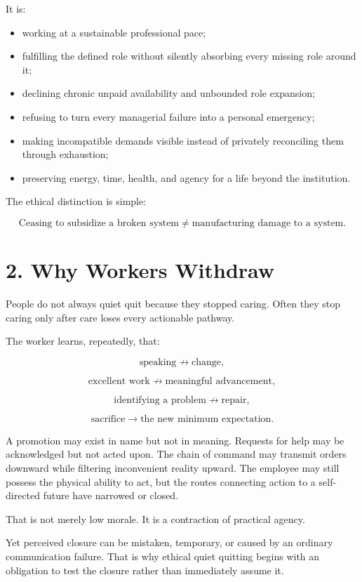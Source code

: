 \documentclass[11pt,oneside]{article}
\providecommand{\tightlist}{%
  \setlength{\itemsep}{0.22em}\setlength{\parskip}{0pt}}
\begin{document}
It is:

\begin{itemize}
\tightlist
\item
  working at a sustainable professional pace;
\item
  fulfilling the defined role without silently absorbing every missing role around it;
\item
  declining chronic unpaid availability and unbounded role expansion;
\item
  refusing to turn every managerial failure into a personal emergency;
\item
  making incompatible demands visible instead of privately reconciling them through exhaustion;
\item
  preserving energy, time, health, and agency for a life beyond the institution.
\end{itemize}

The ethical distinction is simple:

\[
\boxed{\text{Ceasing to subsidize a broken system} \neq \text{manufacturing damage to a system}.}
\]

\section{2. Why Workers Withdraw}\label{why-workers-withdraw}

People do not always quiet quit because they stopped caring. Often they stop caring only after care loses every actionable pathway.

The worker learns, repeatedly, that:

\[
\text{speaking} \nrightarrow \text{change},
\]

\[
\text{excellent work} \nrightarrow \text{meaningful advancement},
\]

\[
\text{identifying a problem} \nrightarrow \text{repair},
\]

\[
\text{sacrifice} \rightarrow \text{the new minimum expectation}.
\]

A promotion may exist in name but not in meaning. Requests for help may be acknowledged but not acted upon. The chain of command may transmit orders downward while filtering inconvenient reality upward. The employee may still possess the physical ability to act, but the routes connecting action to a self-directed future have narrowed or closed.

That is not merely low morale. It is a contraction of practical agency.

Yet perceived closure can be mistaken, temporary, or caused by an ordinary communication failure. That is why ethical quiet quitting begins with an obligation to test the closure rather than immediately assume it.
\end{document}
